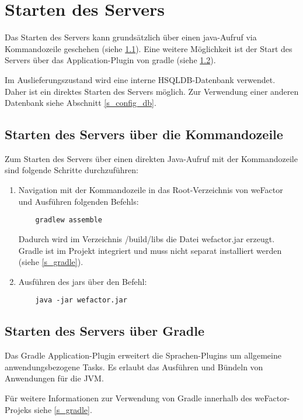 \section{Starten des Servers}\label{s_startserver}
Das Starten des Servers kann grundsätzlich über einen java-Aufruf via Kommandozeile geschehen (siehe \ref{s_startserver_java}). Eine weitere Möglichkeit ist der Start des Servers über das Application-Plugin von gradle (siehe \ref{s_startserver_gradle}). 

Im Auslieferungszustand wird eine interne HSQLDB-Datenbank verwendet. Daher ist ein direktes Starten des Servers möglich. Zur Verwendung einer anderen Datenbank siehe Abschnitt \ref{s_config_db}.

\subsection{Starten des Servers über die Kommandozeile}\label{s_startserver_java}
Zum Starten des Servers über einen direkten Java-Aufruf mit der Kommandozeile sind folgende Schritte durchzuführen:
   \begin{enumerate}

    \item Navigation mit der Kommandozeile in das Root-Verzeichnis von weFactor und Ausführen folgenden Befehls:
    \begin{lstlisting}
    gradlew assemble
    \end{lstlisting}
    Dadurch wird im Verzeichnis /build/libs die Datei wefactor.jar erzeugt. Gradle ist im Projekt integriert und muss nicht separat installiert werden (siehe \ref{s_gradle}).
    \item Ausführen des jars über den Befehl:
    \begin{lstlisting}
    java -jar wefactor.jar
    \end{lstlisting}

   \end{enumerate}


\subsection{Starten des Servers über Gradle}\label{s_startserver_gradle}
Das Gradle Application-Plugin erweitert die Sprachen-Plugins um allgemeine anwendungsbezogene Tasks. Es erlaubt das Ausführen und Bündeln von Anwendungen für die \ac{JVM}.

Für weitere Informationen zur Verwendung von Gradle innerhalb des weFactor-Projeks siehe \ref{s_gradle}.

